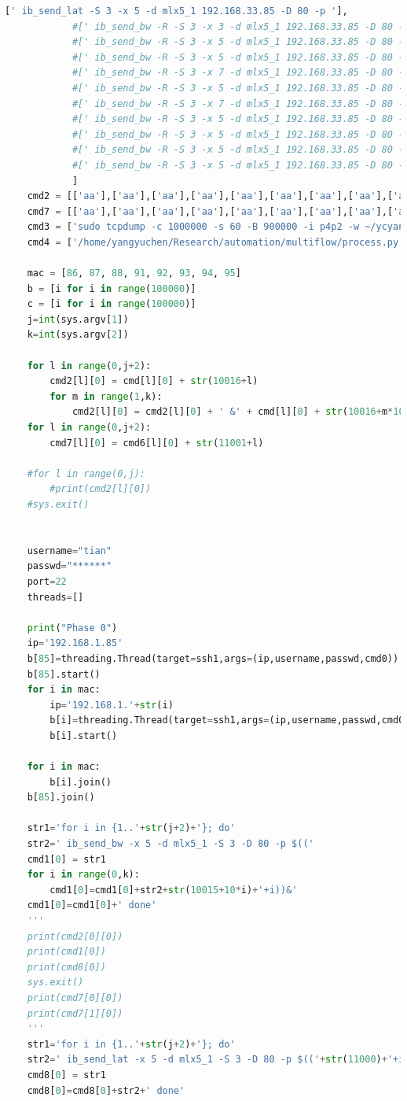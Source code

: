 \documentclass[12pt,a4paper]{article}
\begin{document}
\begin{lstlisting}[language=Python]
            [' ib_send_lat -S 3 -x 5 -d mlx5_1 192.168.33.85 -D 80 -p '],
            #[' ib_send_bw -R -S 3 -x 3 -d mlx5_1 192.168.33.85 -D 80 -p '],
            #[' ib_send_bw -R -S 3 -x 5 -d mlx5_1 192.168.33.85 -D 80 -p '],
            #[' ib_send_bw -R -S 3 -x 5 -d mlx5_1 192.168.33.85 -D 80 -p '],
            #[' ib_send_bw -R -S 3 -x 7 -d mlx5_1 192.168.33.85 -D 80 -p '],
            #[' ib_send_bw -R -S 3 -x 5 -d mlx5_1 192.168.33.85 -D 80 -p '],
            #[' ib_send_bw -R -S 3 -x 7 -d mlx5_1 192.168.33.85 -D 80 -p '],
            #[' ib_send_bw -R -S 3 -x 5 -d mlx5_1 192.168.33.85 -D 80 -p '],
            #[' ib_send_bw -R -S 3 -x 5 -d mlx5_1 192.168.33.85 -D 80 -p '],
            #[' ib_send_bw -R -S 3 -x 5 -d mlx5_1 192.168.33.85 -D 80 -p '],
            #[' ib_send_bw -R -S 3 -x 5 -d mlx5_1 192.168.33.85 -D 80 -p '],
            ]
    cmd2 = [['aa'],['aa'],['aa'],['aa'],['aa'],['aa'],['aa'],['aa'],['aa'],['aa'],['aa'],['aa'],['aa'],['aa'],['aa'],['aa'],['aa'],['aa'],['aa'],['aa'],['aa']]
    cmd7 = [['aa'],['aa'],['aa'],['aa'],['aa'],['aa'],['aa'],['aa'],['aa'],['aa'],['aa'],['aa'],['aa'],['aa'],['aa'],['aa'],['aa'],['aa'],['aa'],['aa'],['aa']]
    cmd3 = ['sudo tcpdump -c 1000000 -s 60 -B 900000 -i p4p2 -w ~/ycyang/result.pcap']
    cmd4 = ['/home/yangyuchen/Research/automation/multiflow/process.py ']

    mac = [86, 87, 88, 91, 92, 93, 94, 95]
    b = [i for i in range(100000)]
    c = [i for i in range(100000)]
    j=int(sys.argv[1])
    k=int(sys.argv[2])

    for l in range(0,j+2):
        cmd2[l][0] = cmd[l][0] + str(10016+l)
        for m in range(1,k):
            cmd2[l][0] = cmd2[l][0] + ' &' + cmd[l][0] + str(10016+m*10+l)
    for l in range(0,j+2):
        cmd7[l][0] = cmd6[l][0] + str(11001+l)

    #for l in range(0,j):
        #print(cmd2[l][0])
    #sys.exit()


    username="tian"
    passwd="******"
    port=22
    threads=[]

    print("Phase 0")
    ip='192.168.1.85'
    b[85]=threading.Thread(target=ssh1,args=(ip,username,passwd,cmd0))
    b[85].start()
    for i in mac:
        ip='192.168.1.'+str(i)
        b[i]=threading.Thread(target=ssh1,args=(ip,username,passwd,cmd0))
        b[i].start()

    for i in mac:
        b[i].join()
    b[85].join()

    str1='for i in {1..'+str(j+2)+'}; do'
    str2=' ib_send_bw -x 5 -d mlx5_1 -S 3 -D 80 -p $(('
    cmd1[0] = str1
    for i in range(0,k):
        cmd1[0]=cmd1[0]+str2+str(10015+10*i)+'+i))&'
    cmd1[0]=cmd1[0]+' done'
    '''
    print(cmd2[0][0])
    print(cmd1[0])
    print(cmd8[0])
    sys.exit()
    print(cmd7[0][0])
    print(cmd7[1][0])
    '''
    str1='for i in {1..'+str(j+2)+'}; do'
    str2=' ib_send_lat -x 5 -d mlx5_1 -S 3 -D 80 -p $(('+str(11000)+'+i))&'
    cmd8[0] = str1
    cmd8[0]=cmd8[0]+str2+' done'


\end{lstlisting}
\end{document}
